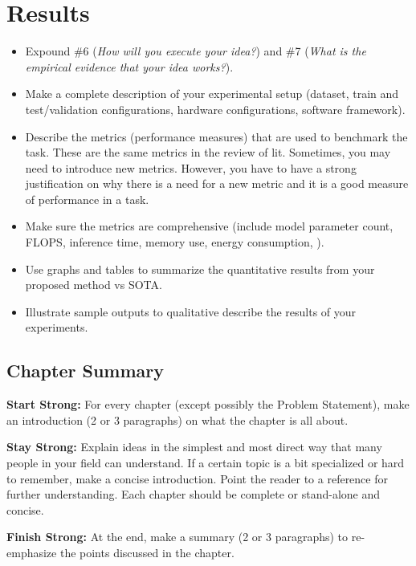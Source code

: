 \chapter{Results}
\label{ch:results}

\begin{itemize}
    \item Expound \#6 (\emph{How will you execute your idea?}) and \#7 (\emph{What is the empirical evidence that your idea works?}).
    \item Make a complete description of your experimental setup (\eg dataset, train and test/validation configurations, hardware configurations, software framework).
    \item Describe the metrics (performance measures) that are used to benchmark the task. These are the same metrics in the review of lit. Sometimes, you may need to introduce new metrics. However, you have to have a strong justification on why there is a need for a new metric and it is a good measure of performance in a task.
    \item Make sure the metrics are comprehensive (\eg include model parameter count, FLOPS, inference time, memory use, energy consumption, \etc).
    \item Use graphs and tables to summarize the quantitative results from your proposed method vs SOTA.
    \item Illustrate sample outputs to qualitative describe the results of your experiments.
\end{itemize}

\section{Chapter Summary}

\textbf{Start Strong:} For every chapter (except possibly the Problem Statement), make an introduction (2 or 3 paragraphs) on what the chapter is all about.

\textbf{Stay Strong:} Explain ideas in the simplest and most direct way that many people in your field can understand. If a certain topic is a bit specialized or hard to remember, make a concise introduction. Point the reader to a reference for further understanding. Each chapter should be complete or stand-alone and concise.

\textbf{Finish Strong:} At the end, make a summary (2 or 3 paragraphs) to re-emphasize the points discussed in the chapter.
